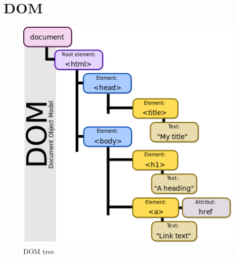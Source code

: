 \hypertarget{dom-1}{%
\section{DOM}\label{dom-1}}

\begin{english}

\begin{Shaded}
\begin{Highlighting}[]
    \KeywordTok{\textgreater{}}
\end{Highlighting}
\end{Shaded}

\end{english}

\begin{figure}
\centering
\includegraphics{src/img/DOM-model.png}
\caption{DOM tree}
\end{figure}

